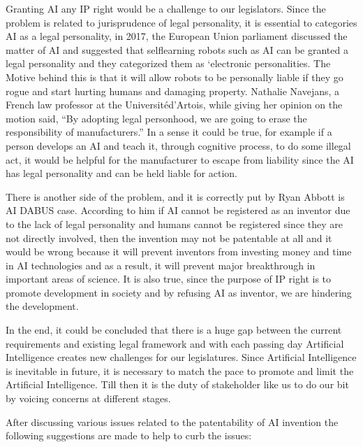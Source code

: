 \begin{multicols}{2}

\noi
Granting AI any IP right would be a challenge to our legislators. Since the problem is related
to jurisprudence of legal personality, it is essential to categories AI as a legal personality, in
2017, the European Union parliament discussed the matter of AI and suggested that selflearning robots such as AI can be granted a legal personality and they categorized them as
‘electronic personalities. The Motive behind this is that it will allow robots to be personally
liable if they go rogue and start hurting humans and damaging property. Nathalie Navejans,
a French law professor at the Universitéd'Artois, while giving her opinion on the motion said, “By adopting legal personhood, we are going to erase the responsibility of
manufacturers.” In a sense it could be true, for example if a person develops an AI and teach
it, through cognitive process, to do some illegal act, it would be helpful for the manufacturer
to escape from liability since the AI has legal personality and can be held liable for action.

\noi
There is another side of the problem, and it is correctly put by Ryan Abbott is AI DABUS
case. According to him if AI cannot be registered as an inventor due to the lack of legal
personality and humans cannot be registered since they are not directly involved, then the
invention may not be patentable at all and it would be wrong because it will prevent
inventors from investing money and time in AI technologies and as a result, it will prevent
major breakthrough in important areas of science. It is also true, since the purpose of IP right
is to promote development in society and by refusing AI as inventor, we are hindering the
development.

\noi
In the end, it could be concluded that there is a huge gap between the current requirements
and existing legal framework and with each passing day Artificial Intelligence creates new
challenges for our legislatures. Since Artificial Intelligence is inevitable in future, it is
necessary to match the pace to promote and limit the Artificial Intelligence. Till then it is the
duty of stakeholder like us to do our bit by voicing concerns at different stages. 

\noi
After discussing various issues related to the patentability of AI invention the following
suggestions are made to help to curb the issues: 

\vspace{-.3cm}


\end{multicols}

